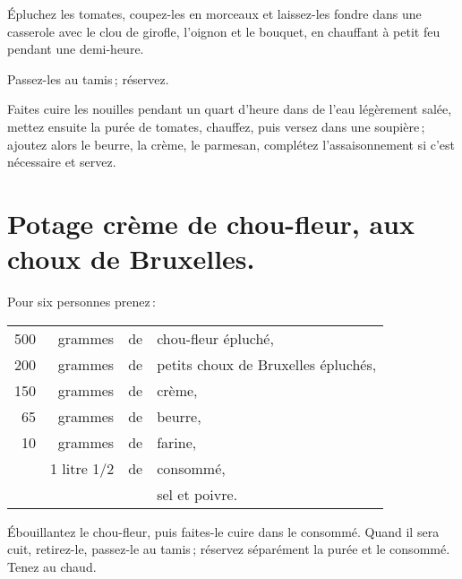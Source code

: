 Épluchez les tomates, coupez-les en morceaux et laissez-les fondre dans une
casserole avec le clou de girofle, l'oignon et le bouquet, en chauffant à petit
feu pendant une demi-heure.

Passez-les au tamis ; réservez.

Faites cuire les nouilles pendant un quart d'heure dans de l'eau légèrement
salée, mettez ensuite la purée de tomates, chauffez, puis versez dans une
soupière ; ajoutez alors le beurre, la crème, le parmesan, complétez
l'assaisonnement si c'est nécessaire et servez.

\section*{\centering Potage crème de chou-fleur, aux choux de Bruxelles.}

Pour six personnes prenez :

\medskip

\footnotesize
\begin{longtable}{rrrp{16em}}                                                    
    500 & grammes     & de & chou-fleur épluché,                                                          \\
    200 & grammes     & de & petits choux de Bruxelles épluchés,                                          \\
    150 & grammes     & de & crème,                                                                       \\
     65 & grammes     & de & beurre,                                                                      \\
     10 & grammes     & de & farine,                                                                      \\
        & 1 litre 1/2 & de & consommé,                                                                    \\
        &             &    & sel et poivre.                                                               \\
\end{longtable}
\normalsize
                                              
Ébouillantez le chou-fleur, puis faites-le cuire dans le consommé. Quand il
sera cuit, retirez-le, passez-le au tamis ; réservez séparément la purée et le
consommé. Tenez au chaud.


